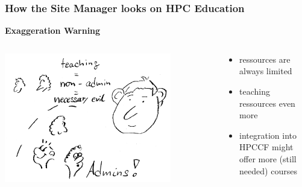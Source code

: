 \begin{frame}
  \frametitle{How the Site Manager looks on HPC Education}
  \centering
  {\bcattention \bf \large Exaggeration Warning \bcattention}
  \begin{columns}
   \begin{column}{0.6\textwidth}
    \centering
    \includegraphics[width=0.8\textwidth]{images/runner}
   \end{column}
   \begin{column}{0.4\textwidth}
    \pause
    \begin{itemize}[<+->]
     \item ressources are always limited
     \item teaching ressources even more
     \item integration into HPCCF might offer more (still needed) courses
    \end{itemize}
   \end{column}
  \end{columns}
\end{frame}

